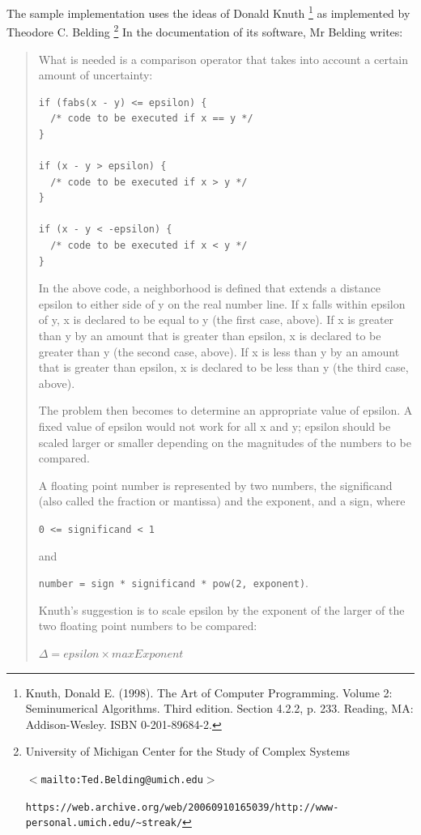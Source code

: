 \documentclass[12pt,a4paper,openany]{memoir} %
\begin{document}
{{The sample implementation uses the ideas of Donald Knuth
\footnote{ Knuth, Donald E. (1998). The Art of Computer Programming.  Volume
2: Seminumerical Algorithms. Third edition. Section 4.2.2,
p. 233. Reading, MA: Addison-Wesley.  ISBN 0-201-89684-2.}
as implemented by Theodore C. Belding
\footnote{
University of Michigan Center for the Study of Complex Systems\par
\texttt{$<$mailto:Ted.Belding@umich.edu$>$}\par
\texttt{https://web.archive.org/web/20060910165039/http://www-personal.umich.edu/\textasciitilde streak/}\par
}
In the documentation of its software, Mr Belding writes:
\begin{quotation}
What is needed is a comparison operator that takes into account a
certain amount of uncertainty:
\begin{verbatim}
if (fabs(x - y) <= epsilon) {
  /* code to be executed if x == y */
}

if (x - y > epsilon) {
  /* code to be executed if x > y */
}

if (x - y < -epsilon) {
  /* code to be executed if x < y */
}
\end{verbatim}
In the above code, a neighborhood is defined that extends a distance
epsilon to either side of y on the real number line.  If x falls
within epsilon of y, x is declared to be equal to y (the first case,
above).  If x is greater than y by an amount that is greater than
epsilon, x is declared to be greater than y (the second case, above).
If x is less than y by an amount that is greater than epsilon, x is
declared to be less than y (the third case, above).

The problem then becomes to determine an appropriate value of epsilon.
A fixed value of epsilon would not work for all x and y; epsilon
should be scaled larger or smaller depending on the magnitudes of the
numbers to be compared.

A floating point number is represented by two numbers, the significand
(also called the fraction or mantissa) and the exponent, and a sign,
where

\verb,0 <= significand < 1, 

and 

\texttt{number = sign * significand * pow(2, exponent)}.

Knuth's suggestion is to scale epsilon by the exponent of the larger of the
two floating point numbers to be compared:

$\Delta = epsilon \times maxExponent$


\end{quotation}}}
\end{document}
